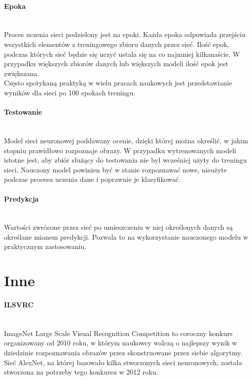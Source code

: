 \paragraph{Epoka} \mbox{}\\
Proces uczenia sieci podzielony jest na epoki. Każda epoka odpowiada przejściu
wszystkich elementów z treningowego zbioru danych przez sieć. Ilość epok, podczas których sieć będzie się uczyć ustala się na co najmniej kilkanaście. W przypadku
większych zbiorów danych lub większych modeli ilość epok jest zwiększana.\\
Często spotykaną praktyką w wielu pracach naukowych jest przedstawianie wyników
dla sieci po 100 epokach treningu.

\paragraph{Testowanie} \mbox{}\\
Model sieci neuronowej poddawany ocenie, dzięki której można określić, w jakim stopniu
prawidłowo rozpoznaje obrazy. W przypadku wytrenowanych modeli istotne jest, aby zbiór służący do
testowania nie był wcześniej użyty do treningu sieci. Nauczony model powinien być w stanie
rozpoznawać nowe, nieużyte podczas procesu uczenia dane i poprawnie je klasyfikować.

\paragraph{Predykcja} \mbox{}\\
Wartości zwrócone przez sieć po umieszczeniu w niej określonych danych są określane
mianem predykcji. Pozwala to na wykorzystanie nauczonego modelu w praktycznym
zastosowaniu.

\section{Inne}

\paragraph{ILSVRC} \mbox{}\\
ImageNet Large Scale Visual Recognition Competition \cite{ILSVRC} to coroczny konkurs organizowany
od 2010 roku, w którym naukowcy walczą o najlepszy wynik w dziedzinie rozpoznawania
obrazów przez skonstruowane przez siebie algorytmy. Sieć AlexNet, na której bazowało
kilka stworzonych sieci neuronowych, została stworzona na potrzeby tego konkursu
w 2012 roku.

